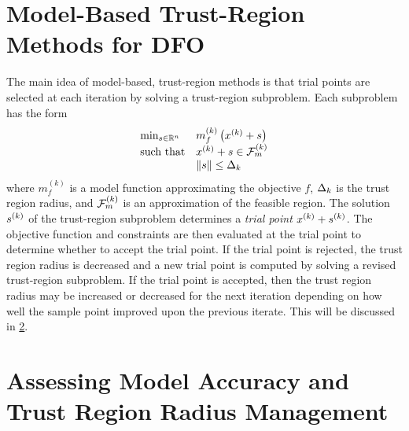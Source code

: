 







\section{Model-Based Trust-Region Methods for DFO}

The main idea of model-based, trust-region methods is that trial points are selected at each iteration by solving a trust-region subproblem.  
Each subproblem has the form 
\[ \begin{array}{ll} \min_{s \in \mathbb R^n} & m_f^{(k)}\left(x^{(k)} + s\right) \\ 
\textrm{such that} & x^{(k)}+s \in {\mathcal F_m^{(k)}} \\
& {\left\|s\right\|} \le \Delta_k
\end{array} \]
where $m_f^{(k)}$ is a model function approximating the objective $f$, $\Delta_k$ is the trust region radius,
and ${\mathcal F_m^{(k)}}$ is an approximation of the feasible region.
The solution ${{s}^{(k)}}$ of the trust-region subproblem determines a {\em trial point} $x^{(k)} + {{s}^{(k)}}$.  
The objective function and constraints are then evaluated at the trial point to determine whether to accept the trial point.
If the trial point is rejected, the trust region radius is decreased and a new trial point is computed by solving a revised trust-region subproblem.     
If the trial point is accepted, then the trust region radius may be increased or decreased for the next iteration 
depending on how well the sample point improved upon the previous iterate.
This will be discussed in \cref{rhosection}.


\section{Assessing Model Accuracy and Trust Region Radius Management}

\label{rhosection}

